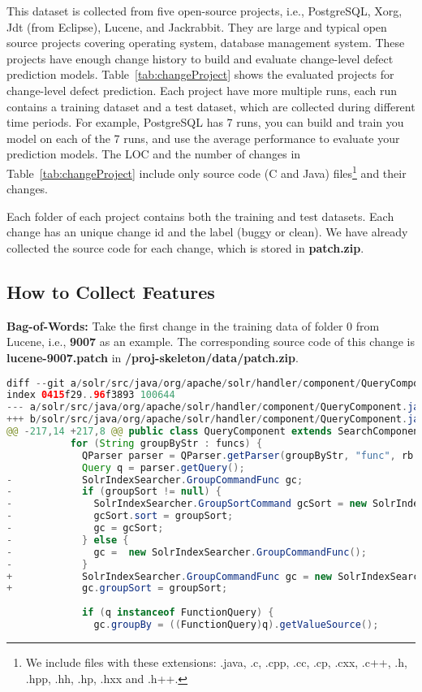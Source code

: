 \documentclass[10pt]{article}
\begin{document}
This dataset is collected from five open-source projects, i.e., 
PostgreSQL, Xorg, Jdt (from Eclipse), Lucene, and Jackrabbit. 
They are large and typical open source projects covering operating system,
database management system. 
These projects have enough change history to build and evaluate
change-level defect prediction models.  
Table~\ref{tab:changeProject} shows the evaluated 
projects for change-level defect prediction. 
Each project have more multiple runs, each run contains a training dataset and a test dataset, 
which are collected during different time periods.   
For example, PostgreSQL has 7 runs, you can build and train you model on each of the 7 runs, 
and use the average performance to evaluate your prediction models. 
The LOC and the number of changes in 
Table~\ref{tab:changeProject} include only 
source code (C and Java) files\footnote{We include files with these extensions: 
.java, .c, .cpp, .cc, .cp, .cxx, .c++, .h, .hpp, .hh, .hp, .hxx and .h++.} and their changes. 

Each folder of each project contains both the training and test datasets. 
Each change has an unique change id and the label (buggy or clean). 
We have already collected the source code for each change, which is stored in \textbf{patch.zip}. 

\subsection*{How to Collect Features}
\label{sec:features}

\textbf{Bag-of-Words:} 
Take the first change in the training data of folder 0 from Lucene, i.e., \textbf{9007} as an example. 
The corresponding source code of this change is \textbf{lucene-9007.patch} in \textbf{/proj-skeleton/data/patch.zip}.

\begin{lstlisting}[language=Java]
diff --git a/solr/src/java/org/apache/solr/handler/component/QueryComponent.java b/solr/src/java/org/apache/solr/handler/component/QueryComponent.java
index 0415f29..96f3893 100644
--- a/solr/src/java/org/apache/solr/handler/component/QueryComponent.java
+++ b/solr/src/java/org/apache/solr/handler/component/QueryComponent.java
@@ -217,14 +217,8 @@ public class QueryComponent extends SearchComponent
           for (String groupByStr : funcs) {
             QParser parser = QParser.getParser(groupByStr, "func", rb.req);
             Query q = parser.getQuery();
-            SolrIndexSearcher.GroupCommandFunc gc;
-            if (groupSort != null) {
-              SolrIndexSearcher.GroupSortCommand gcSort = new SolrIndexSearcher.GroupSortCommand();
-              gcSort.sort = groupSort;
-              gc = gcSort;
-            } else {
-              gc =  new SolrIndexSearcher.GroupCommandFunc();
-            }
+            SolrIndexSearcher.GroupCommandFunc gc = new SolrIndexSearcher.GroupCommandFunc();
+            gc.groupSort = groupSort;
 
             if (q instanceof FunctionQuery) {
               gc.groupBy = ((FunctionQuery)q).getValueSource();
\end{lstlisting}
\end{document}
